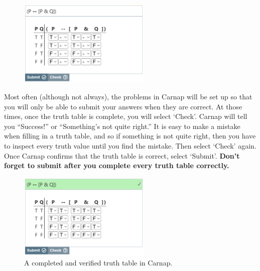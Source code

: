 \begin{figure} [h]
\centering
\includegraphics[width=6.3cm]{tt-2.png}
\caption{}
\label{fig:tt-2}
\end{figure}

Most often (although not always), the problems in Carnap will be set up so that you will only be able to submit your answers when they are correct. At those times, once the truth table is complete, you will select `Check'. Carnap will tell you ``Success!'' or ``Something's not quite right.'' It is easy to make a mistake when filling in a truth table, and so if something is not quite right, then you have to inspect every truth value until you find the mistake. Then select `Check' again. Once Carnap confirms that the truth table is correct, select `Submit'. \textbf{Don't forget to submit after you complete every truth table correctly.}


\begin{figure}%
\centering
\includegraphics[width=6.3cm]{tt-6a.png}
\caption{A completed and verified truth table in Carnap.}
\label{fig:tt-6}
\end{figure}	%






